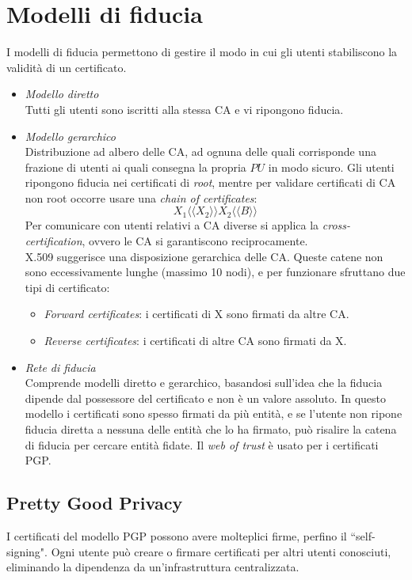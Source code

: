 \documentclass[a4paper, 11pt, twoside, openright, fleqn]{report}
\newcommand{\llangle}{\langle\!\langle}
\newcommand{\rrangle}{\rangle\!\rangle}
\begin{document}
\section{Modelli di fiducia}
I modelli di fiducia permettono di gestire il modo in cui gli utenti stabiliscono la validità di un certificato.
\begin{itemize}
	\item \emph{Modello diretto}\\
	Tutti gli utenti sono iscritti alla stessa CA e vi ripongono fiducia.
	\item \emph{Modello gerarchico}\\
	Distribuzione ad albero delle CA, ad ognuna delle quali corrisponde una frazione di utenti ai quali consegna la propria $PU$ in modo sicuro.
	Gli utenti ripongono fiducia nei certificati di \emph{root}, mentre per validare certificati di CA non root occorre usare una \emph{chain of certificates}:
	\begin{equation*}
		X_1\llangle X_2\rrangle X_2 \llangle B \rrangle
	\end{equation*}
	Per comunicare con utenti relativi a CA diverse si applica la \emph{cross-certification}, ovvero le CA si garantiscono reciprocamente.\\
	X.509 suggerisce una disposizione gerarchica delle CA. Queste catene non sono eccessivamente lunghe (massimo 10 nodi), e per funzionare sfruttano due tipi di certificato: 
	\begin{itemize}
		\item \emph{Forward certificates}: i certificati di X sono firmati da altre CA.
		\item \emph{Reverse certificates}: i certificati di altre CA sono firmati da X.
	\end{itemize}
	\item \emph{Rete di fiducia}\\
	Comprende modelli diretto e gerarchico, basandosi sull'idea che la fiducia dipende dal possessore del certificato e non è un valore assoluto. In questo modello i certificati sono spesso firmati da più entità, e se l'utente non ripone fiducia diretta a nessuna delle entità che lo ha firmato, può risalire la catena di fiducia per cercare entità fidate. Il \emph{web of trust} è usato per i certificati PGP.
\end{itemize}

\subsection{Pretty Good Privacy}
I certificati del modello PGP possono avere molteplici firme, perfino il ``self-signing". Ogni utente può creare o firmare certificati per altri utenti conosciuti, eliminando la dipendenza da un'infrastruttura centralizzata.
\end{document}
